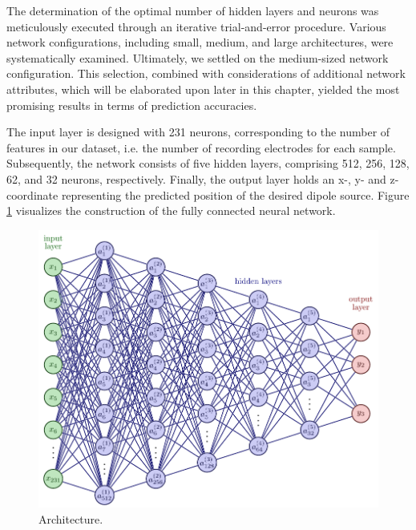 \documentclass[a4paper, UKenglish, 11pt]{uiomaster}
\begin{document}
The determination of the optimal number of hidden layers and neurons was meticulously executed through an iterative trial-and-error procedure. Various network configurations, including small, medium, and large architectures, were systematically examined. Ultimately, we settled on the medium-sized network configuration. This selection, combined with considerations of additional network attributes, which will be elaborated upon later in this chapter, yielded the most promising results in terms of prediction accuracies.

The input layer is designed with 231 neurons, corresponding to the number of features in our dataset, i.e. the number of recording electrodes for each sample. Subsequently, the network consists of five hidden layers, comprising 512, 256, 128, 62, and 32 neurons, respectively. Finally, the output layer holds an x-, y- and z-coordinate representing the predicted position of the desired dipole source. Figure \ref{fig:FFNN_architecture} visualizes the construction of the fully connected neural network.

\begin{figure}[!htb]
    \centering
    \includegraphics[width=\linewidth]{figures/FFNN_architecture.pdf}
    \caption{Architecture.}
    \label{fig:FFNN_architecture}
\end{figure}
\end{document}
